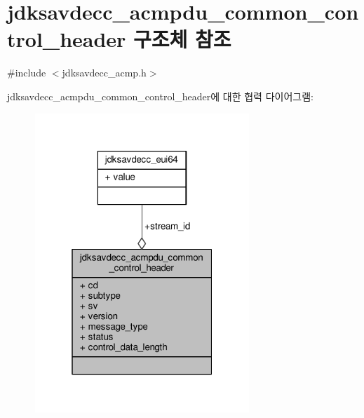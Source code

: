 \hypertarget{structjdksavdecc__acmpdu__common__control__header}{}\section{jdksavdecc\+\_\+acmpdu\+\_\+common\+\_\+control\+\_\+header 구조체 참조}
\label{structjdksavdecc__acmpdu__common__control__header}


{\ttfamily \#include $<$jdksavdecc\+\_\+acmp.\+h$>$}



jdksavdecc\+\_\+acmpdu\+\_\+common\+\_\+control\+\_\+header에 대한 협력 다이어그램\+:
\nopagebreak
\begin{figure}[H]
\begin{center}
\leavevmode
\includegraphics[width=229pt]{structjdksavdecc__acmpdu__common__control__header__coll__graph}
\end{center}
\end{figure}
